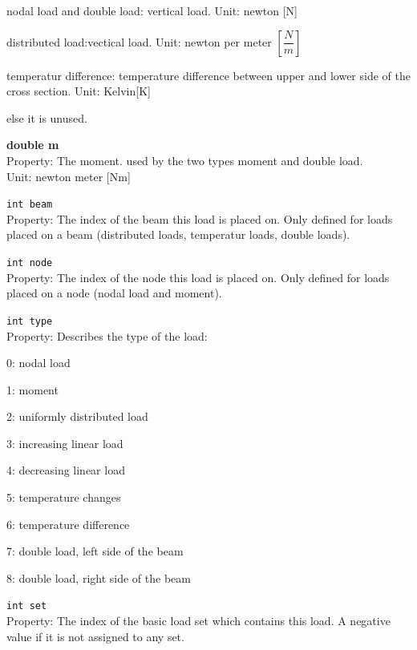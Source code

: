 \begin{trivlist}
\begin{trivlist}
\begin{trivlist}
\begin{trivlist}
			\leftskip=2cm
			\item[] nodal load and double load: vertical load. Unit: newton [N]
			\item[] distributed load:vectical load. Unit: newton per meter $\left[\dfrac{N}{m}\right]$
			\item[] temperatur difference: temperature difference between upper and lower side of the cross section. Unit: Kelvin[K]
			\item[] else it is unused.
		\end{trivlist}
	\end{trivlist}
	\item[]\textbf{double m}\\Property: The moment. used by the two types moment and double load.\\Unit: newton meter [Nm]
	\item[]\texttt{int beam}\\Property: The index of the beam this load is placed on. Only defined for loads placed on a beam (distributed loads, temperatur loads, double loads).
	\item[]\texttt{int node}\\Property: The index of the node this load is placed on. Only defined for loads placed on a node (nodal load and moment).
	\item[]\texttt{int type}\\Property: Describes the type of the load:
	\begin{trivlist}
		\leftskip=1cm
		\item[]0: nodal load
		\item[]1: moment
		\item[]2: uniformly distributed load
		\item[]3: increasing linear load
		\item[]4: decreasing linear load
		\item[]5: temperature changes
		\item[]6: temperature difference
		\item[]7: double load, left side of the beam
		\item[]8: double load, right side of the beam
	\end{trivlist}
	\item[]\texttt{int set}\\Property: The index of the basic load set which contains this load. A negative value if it is not assigned to any set.
\end{trivlist}



\end{trivlist}
